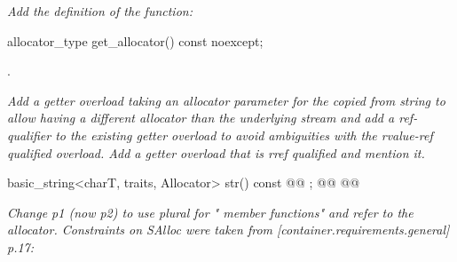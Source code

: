 \documentclass[ebook,11pt,article]{memoir}
\begin{document}
\textit{Add the definition of the  function:}
\begin{addedblock}
\begin{itemdecl}
allocator_type get_allocator() const noexcept;
\end{itemdecl}

\begin{itemdescr}
\pnum
\returns {}.

\end{itemdescr}
\end{addedblock}




\textit{Add a getter overload taking an allocator parameter for the copied from string to allow having a different allocator than the underlying stream and add a ref-qualifier to the existing getter overload to avoid ambiguities with the rvalue-ref qualified overload. Add a getter overload that is rref qualified and mention it.}
\begin{itemdecl}
    basic_string<charT, traits, Allocator> str() const @\added{\&}@ ;
    @@
    @@

\end{itemdecl}

\textit{Change p1 (now p2) to use plural for " member functions" and refer to the allocator. Constraints on SAlloc were taken from [container.requirements.general] p.17:}
\end{document}
